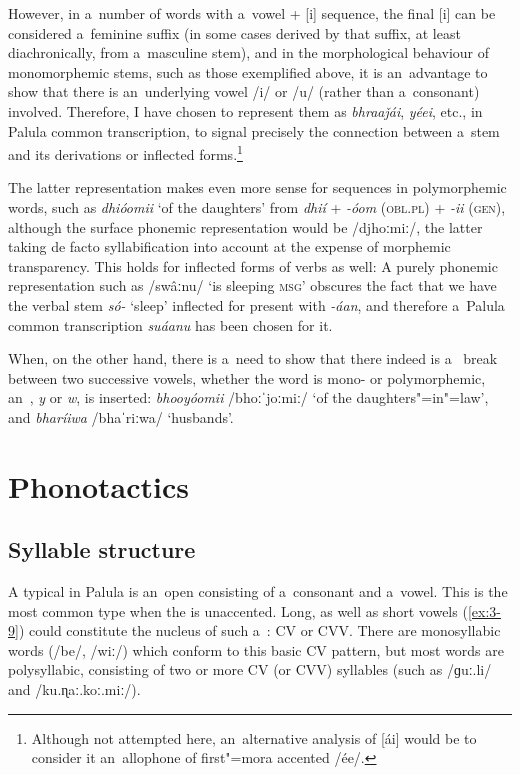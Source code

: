 However, in a~number of words with a~vowel + [i] sequence, the final [i] can be considered a~feminine  suffix (in some cases derived by that suffix, at least diachronically, from a~masculine stem), and in the morphological behaviour of monomorphemic stems, such as those exemplified above, it is an~advantage to show that there is an~underlying vowel /i/ or /u/ (rather than a~consonant) involved. Therefore, I have chosen to represent them as \textit{bhraaǰái}, \textit{yéei}, etc., in Palula common transcription, to signal precisely the connection between a~stem and its derivations or inflected forms.\footnote{Although not attempted here, an~alternative analysis of [ái] would be to consider it an~allophone of first"=mora accented /ée/.} 


The latter representation makes even more sense for sequences in polymorphemic words, such as \textit{dhióomii} `of the daughters' from \textit{dhií} + \textit{-óom} (\textsc{obl.pl)} + \textit{-ii} (\textsc{gen)}, although the surface phonemic representation would be /djhoːmiː/, the latter taking de facto syllabification into account at the expense of morphemic transparency. This holds for inflected forms of verbs as well: A purely phonemic representation such as /swâːnu/ `is sleeping \textsc{msg}' obscures the fact that we have the verbal stem \textit{só-} `sleep' inflected for present  with \textit{-áan}, and therefore a~Palula common transcription \textit{suáanu} has been chosen for it.


When, on the other hand, there is a~need to show that there indeed is a~ break between two successive vowels, whether the word is mono- or polymorphemic, an~, \textit{y} or \textit{w}, is inserted: \textit{bhooyóomii} /bhoːˈjoːmiː/ `of the daughters"=in"=law', and \textit{bharíiwa} /bhaˈriːwa/ `husbands'.


\section{Phonotactics}
\label{sec:3-3}

\subsection{Syllable structure}
\label{subsec:3-3-1}


A typical  in Palula is an~open  consisting of a~consonant and a~vowel. This is the most common type when the  is unaccented. Long, as well as short vowels (\ref{ex:3-9}) could constitute the nucleus of such a~: CV or CVV. There are monosyllabic words (/be/, /wiː/) which conform to this basic CV pattern, but most words are polysyllabic, consisting of two or more CV (or CVV) syllables (such as /ɡuː.li/ and /ku.ɳaː.koː.miː/).

